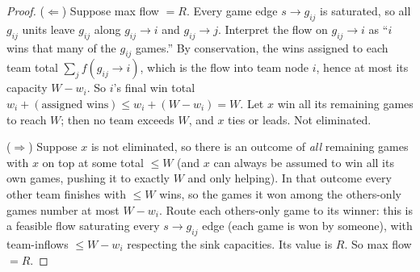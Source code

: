 \begin{proof}
($\Leftarrow$) Suppose max flow $=R$. Every game edge $s\to g_{ij}$ is saturated, so all $g_{ij}$ units leave $g_{ij}$ along $g_{ij}\to i$ and $g_{ij}\to j$. Interpret the flow on $g_{ij}\to i$ as ``$i$ wins that many of the $g_{ij}$ games.'' By conservation, the wins assigned to each team total $\sum_j f(g_{ij}\to i)$, which is the flow into team node $i$, hence at most its capacity $W-w_i$. So $i$'s final win total $w_i + (\text{assigned wins}) \le w_i + (W - w_i) = W$. Let $x$ win all its remaining games to reach $W$; then no team exceeds $W$, and $x$ ties or leads. Not eliminated.

($\Rightarrow$) Suppose $x$ is not eliminated, so there is an outcome of \emph{all} remaining games with $x$ on top at some total $\le W$ (and $x$ can always be assumed to win all its own games, pushing it to exactly $W$ and only helping). In that outcome every other team finishes with $\le W$ wins, so the games it won among the others-only games number at most $W - w_i$. Route each others-only game to its winner: this is a feasible flow saturating every $s\to g_{ij}$ edge (each game is won by someone), with team-inflows $\le W - w_i$ respecting the sink capacities. Its value is $R$. So max flow $=R$.
\end{proof}

